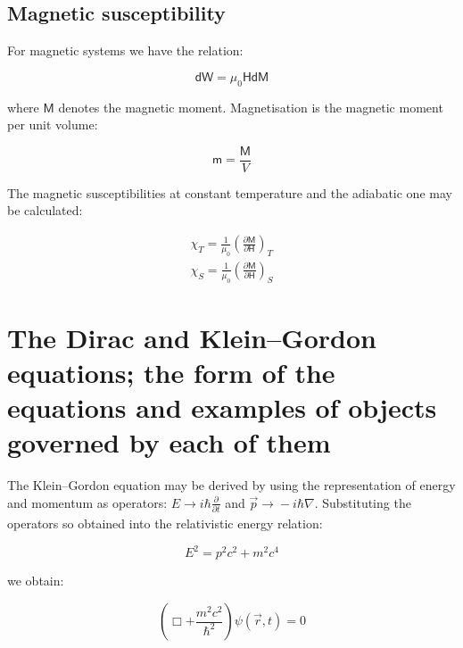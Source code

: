 \subsection{Magnetic susceptibility}

For magnetic systems we have the relation:

\begin{equation}
    \mathsf{dW} = \mu_{0}\mathsf{H}\mathsf{dM}
\end{equation}

where $\mathsf{M}$ denotes the magnetic moment. Magnetisation is the magnetic moment per unit volume:

\begin{equation}
    \mathsf{m} = \frac{\mathsf{M}}{V}
\end{equation}

The magnetic susceptibilities at constant temperature and the adiabatic one may be calculated:

\begin{equation}
    \begin{matrix}
        \chi_{T} = \frac{1}{\mu_{0}}\left(\frac{\partial\mathsf{M}}{\partial\mathsf{H}}\right)_{T}\\
        \chi_{S} = \frac{1}{\mu_{0}}\left(\frac{\partial\mathsf{M}}{\partial\mathsf{H}}\right)_{S}
    \end{matrix}
\end{equation}

\section{The Dirac and Klein--Gordon equations; the form of the equations and examples of objects governed by each of them}

The Klein--Gordon equation may be derived by using the representation of energy and momentum as operators: $E \xrightarrow[]{} i\hbar \frac{\partial}{\partial t}$ and $\vec{p}\xrightarrow[]{} - i\hbar\nabla$. Substituting the operators so obtained into the relativistic energy relation:

\begin{equation}
    E^2 = p^2c^2 + m^2c^4
\end{equation}

we obtain:

\begin{equation}
    \left( \Box + \frac{m^2c^2}{\hbar^2}  \right)\psi(\vec{r},t) = 0
\end{equation}

